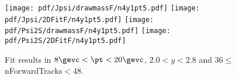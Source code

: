 \begin{figure}[H]
\begin{center}
\texttt{[image: pdf/Jpsi/drawmassF/n4y1pt5.pdf]}
\texttt{[image: pdf/Jpsi/2DFitF/n4y1pt5.pdf]}
\vspace*{-0.5cm}
\texttt{[image: pdf/Psi2S/drawmassF/n4y1pt5.pdf]}
\texttt{[image: pdf/Psi2S/2DFitF/n4y1pt5.pdf]}
\vspace*{-0.5cm}
\end{center}
\caption{Fit results in $8\gevc<\pt<20\gevc$, $2.0<y<2.8$ and 36$\leq$nForwardTracks$<$48.}
\label{Fitn4y1pt5}
\end{figure}
